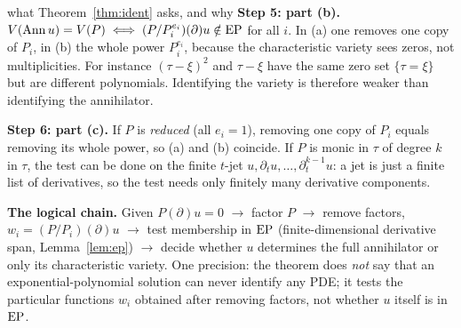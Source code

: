 \begin{explained}{what Theorem~\ref{thm:ident} asks, and why}
\medskip\textbf{Step 5: part (b).} $V(\operatorname{Ann} u)=V(P)\iff(P/P_i^{e_i})(\partial)u\notin\mathrm{EP}$ for all $i$. In (a) one removes one copy of $P_i$, in (b) the whole power $P_i^{e_i}$, because the characteristic variety sees zeros, not multiplicities. For instance $(\tau-\xi)^2$ and $\tau-\xi$ have the same zero set $\{\tau=\xi\}$ but are different polynomials. Identifying the variety is therefore weaker than identifying the annihilator.

\medskip\textbf{Step 6: part (c).} If $P$ is \emph{reduced} (all $e_i=1$), removing one copy of $P_i$ equals removing its whole power, so (a) and (b) coincide. If $P$ is monic in $\tau$ of degree $k$ in $\tau$, the test can be done on the finite $t$-jet $u,\partial_tu,\dots,\partial_t^{k-1}u$: a jet is just a finite list of derivatives, so the test needs only finitely many derivative components.

\medskip\textbf{The logical chain.} Given $P(\partial)u=0$ $\to$ factor $P$ $\to$ remove factors, $w_i=(P/P_i)(\partial)u$ $\to$ test membership in $\mathrm{EP}$ (finite-dimensional derivative span, Lemma~\ref{lem:ep}) $\to$ decide whether $u$ determines the full annihilator or only its characteristic variety. One precision: the theorem does \emph{not} say that an exponential-polynomial solution can never identify any PDE; it tests the particular functions $w_i$ obtained after removing factors, not whether $u$ itself is in $\mathrm{EP}$.
\end{explained}

